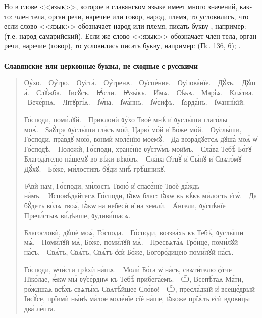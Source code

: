 \documentclass[11pt,a4paper,oneside]{memoir}
\newcommand{\exercise}{}
\newcommand{\exquote}{quote}
\newcommand{\sdash}{\textenglish{\textemdash}}
\begin{document}
Но в слове <<язык>>, которое в славянском языке имеет много значений, как-то: член тела, орган речи, наречие или говор, народ, племя, то условились, что если слово <<язык>> обозначает народ или племя, писать букву {}, например: {} (т.е. народ самарийский). Если же слово <<язык>> обозначает член тела, орган речи, наречие (говор), то условились писать букву{}, например: {} (Пс. 136, 6); {}.

\paragraph{\exercise}

\textbf{Славянские или церковные буквы, не сходные с русскими}

\begin{\exquote}\begin{slv}
		Оу҆́хо.~\sdash~Оу҆́тро.~\sdash~Оу҆ста̀.~\sdash~Оу҆́тренѧ.~\sdash~Оу҆спе́ние.~\sdash~Оу҆пова́нїе.~\sdash~Дꙋ́хъ.~\sdash~Дꙋша̀.~\sdash~Слꙋ́жба.~\sdash~І҆исꙋ́съ.~\sdash~Ꙗ҆́сли.~\sdash~Ꙗ҆зы́къ.~\sdash~И҆́мѧ.~\sdash~Сѣ́ьѧ.~\sdash~Марі́ѧ.~\sdash~Клѧ́тва.~\sdash~Вече́рнѧ.~\sdash~Лїтꙋргі́ѧ.~\sdash~І҆ѡ́на.~\sdash~І҆ѡа́ннъ.~\sdash~І҆ѡ́сифъ.~\sdash~І҆ѻрда́нъ.~\sdash~І҆ѡанні́кїй.

		Го́споди, поми́лꙋй.~\sdash~Приклонѝ ᲂу҆́хо Твоѐ мнѣ̀ и҆ ᲂуслы́ши глаго́лы моѧ̀.~\sdash~Ѕаꙋ́тра ᲂу҆слы́ши гла́съ мо́й, Царю̀ мо́й и҆ Бо́же мо́й.~\sdash~Оу҆слы́ши, Го́споди, пра́вдꙋ мою̀, вонмѝ моле́нїю моемꙋ̀.~\sdash~Да возра́дꙋетсѧ дꙋша̀ моѧ̀ ѡ҆ Го́сподѣ.~\sdash~Положѝ, Го́споди, хране́нїе ᲂу҆стѡ́мъ мои̑мъ.~\sdash~Сла́ва Тебѣ̀ Бо́гꙋ Благода́телю на́шемꙋ во вѣ́ки вѣко́въ.~\sdash~Сла́ва Ѻ҆тцꙋ̀ и҆ Сы́нꙋ и҆ Свѧто́мꙋ Дꙋ́хꙋ.~\sdash~Бо́же, ми́лостивъ бꙋ́ди мнѣ̀ грѣ́шникꙋ.

		Ꙗ҆вѝ нам, Го́споди, ми́лость Твою̀ и҆ спасе́нїе Твоѐ да́ждь на́мъ.~\sdash~И҆сповѣ́дайтесѧ Го́споди, ꙗ҆́кѡ благ: ꙗ҆́кѡ въ вѣ́къ ми́лость є҆гѡ́.~\sdash~Да бꙋ́детъ во́лѧ твоѧ̀, ꙗ҆́кѡ на небесѝ и҆ на землѝ.~\sdash~А҆́нгели, ᲂу҆спѣ́нїе Пречи́стыѧ ви́дѣвше, ᲂу҆диви́шасѧ.

		Благословѝ, дꙋшѐ моѧ̀, Го́спода.~\sdash~Го́споди, воззва́хъ къ Тебѣ̀, ᲂу҆слы́ши мѧ̀.~\sdash~Поми́лꙋй мѧ̀, Бо́же, поми́лꙋй мѧ̀.~\sdash~Пресвѧта́ѧ Тро́ице, поми́лꙋй на́съ.~\sdash~Свѧ́тъ, Свѧ́тъ, Свѧ́тъ є҆сѝ Бо́же, Богоро́дицею поми́лꙋй на́съ.

		Го́споди, ѡ҆чи́сти грѣхѝ на́шѧ.~\sdash~Моли́ Бо́га ѡ҆ на́съ, свѧти́телю ѻ҆́тче Нїко́лае, ꙗ҆́кѡ мы̀ ᲂу҆се́рднѡ къ Тебѣ̀ прибега́емъ.~\sdash~Ѽ, Всепѣ́таѧ Ма́ти, ро́ждшаѧ всѣ́хъ свѧты́хъ Свѧтѣ́йшее Сло́во!~\sdash~Ѽ, пресла́дкїй и҆ всеще́дрый І҆исꙋ́се, прїимѝ ны́нѣ ма́лое моле́нїе сїѐ на́ше, ꙗ҆́коже прїѧ́лъ є҆сѝ вдови́цы два̀ ле́пта.
	\end{slv}\end{\exquote}
\end{document}
